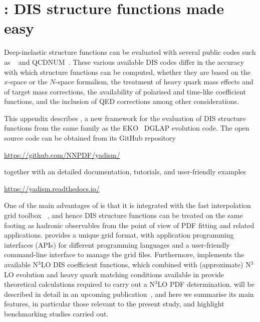 
\section{\yadism: DIS structure functions made easy}
\label{app/dis:yadism}

Deep-inelastic structure functions can be evaluated with several public codes
such as \apfel~\cite{Bertone:2013vaa} and \textsc{\small
QCDNUM}~\cite{Botje:2010ay}.
%
These various available DIS codes differ in the accuracy with which structure
functions can be computed, whether they are based on the $x$-space or the
$N$-space formalism, the treatment of heavy quark mass effects and of target
mass corrections, the availability of polarised and time-like coefficient
functions, and the inclusion of QED corrections among  other considerations.

This appendix describes \yadism, a new framework for the evaluation of DIS
structure functions from the same family as the \textsc{\small
EKO}~\cite{Candido:2022tld} DGLAP evolution code.
%
The open source \yadism code can be obtained from its GitHub repository
\begin{center}
  \url{https://github.com/NNPDF/yadism/}
\end{center}  
together with an detailed documentation, tutorials, and user-friendly examples
\begin{center}
  \url{https://yadism.readthedocs.io/}
\end{center}  
One of the main advantages of \yadism is that it is integrated with the fast
interpolation grid toolbox \pineappl~\cite{Carrazza:2020gss},
and hence DIS structure functions can be treated on the same footing as
hadronic observables from the point of view of PDF fitting and related
applications.
%
\pineappl provides a unique grid format, with application
programming interfaces (APIs) for different programming languages and a
user-friendly command-line interface to manage the grid files.
%
Furthermore, \yadism implements the available N$^3$LO DIS coefficient
functions, which combined with (approximate)  N$^3$LO evolution and heavy quark
matching conditions available in \eko provide theoretical
calculations required to carry out a N$^3$LO PDF determination.
%
\yadism will be described in detail in an upcoming publication~\cite{yadism},
and here we summarise its main features, in particular those relevant to the
present study, and highlight benchmarking studies carried out.

